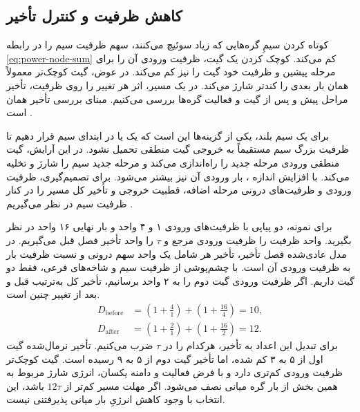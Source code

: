 \subsection{کاهش ظرفیت و کنترل تأخیر}
\label{sec:power-capacitance-reduction}

کوتاه کردن سیمِ گره‌هایی که زیاد سوئیچ می‌کنند، سهم ظرفیت سیم را در
رابطه \eqref{eq:power-node-sum} کم می‌کند. کوچک کردن یک گیت، ظرفیت
ورودی آن را برای مرحله پیشین و ظرفیت  خود گیت را نیز
کم می‌کند. در عوض، گیت کوچک‌تر معمولاً همان بار بعدی را کندتر شارژ
می‌کند. در یک مسیر، اثر هر تغییر را روی ظرفیت، تأخیر مراحل پیش و پس
از گیت و فعالیت گره‌ها بررسی می‌کنیم. مبنای بررسی تأخیر همان
است \cite[بخش ، صفحات ۱۸۸ تا ۱۹۰]{weste}
\cite[اسلاید ۱۸]{powerslides}.

برای یک سیم بلند، یکی از گزینه‌ها این است که یک
 یا  در ابتدای سیم قرار دهیم تا
ظرفیت بزرگ سیم مستقیماً به خروجی گیت منطقی تحمیل نشود. در این
آرایش، گیت منطقی ورودی مرحله جدید را راه‌اندازی می‌کند و
مرحله جدید سیم را شارژ و تخلیه می‌کند. با افزایش اندازه
، بار ورودی آن نیز بیشتر می‌شود. برای تصمیم‌گیری،
ظرفیت ورودی و ظرفیت‌های درونی مرحله اضافه، قطبیت خروجی و تأخیر
کل مسیر را در کنار ظرفیت سیم در نظر می‌گیریم
\cite[بخش ، صفحه ۱۸۸]{weste}
\cite[اسلاید ۱۸]{powerslides}.

برای نمونه، دو  پیاپی با ظرفیت‌های ورودی ۱ و ۴ واحد
و بار نهایی ۱۶ واحد در نظر بگیرید. واحد ظرفیت را ظرفیت ورودی
 مرجع و \(\tau\) را واحد تأخیر فصل قبل می‌گیریم.
در مدل عادی‌شده فصل تأخیر، تأخیر هر  شامل یک واحد
سهم درونی و نسبت ظرفیت بار به ظرفیت ورودی آن است. با چشم‌پوشی از
ظرفیت سیم و شاخه‌های فرعی، فقط دو گیت داریم. اگر ظرفیت ورودی گیت
دوم را به ۲ واحد برسانیم، تأخیر کل به‌ترتیب قبل و بعد از تغییر چنین است.
\[
  \begin{aligned}
    D_{\mathrm{before}} &= \left(1+\frac{4}{1}\right)
                         +\left(1+\frac{16}{4}\right)=10,\\
    D_{\mathrm{after}}  &= \left(1+\frac{2}{1}\right)
                         +\left(1+\frac{16}{2}\right)=12.
  \end{aligned}
\]
برای تبدیل این اعداد به تأخیر، هرکدام را در \(\tau\) ضرب می‌کنیم.
تأخیر نرمال‌شده گیت اول از ۵ به ۳ کم شده، اما
تأخیر گیت دوم از ۵ به ۹ رسیده است. گیت کوچک‌تر ظرفیت ورودی کم‌تری
دارد و با فرض فعالیت و دامنه یکسان، انرژی شارژ مربوط به همین بخش
از بار گره میانی نصف می‌شود. اگر مهلت مسیر کم‌تر از \(12\tau\)
باشد، این انتخاب با وجود کاهش انرژیِ بار میانی پذیرفتنی نیست.

